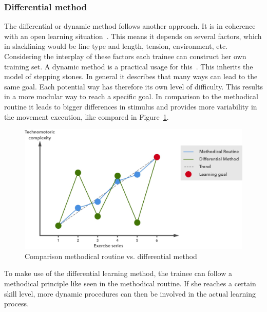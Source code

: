 \subsubsection{Differential method}
The differential or dynamic method follows another approach. It is in coherence with an open learning situation~\cite{Thomann2013-aa}. This means it depends on several factors, which in slacklining would be line type and length, tension, environment, etc. Considering the interplay of these factors each trainee can construct her own training set.
A dynamic method is a practical usage for this~\cite{Beck2008-dl, Schoellhorn1999-ip}. This inherits the model of stepping stones. In general it describes that many ways can lead to the same goal. Each potential way has therefore its own level of difficulty. This results in a more modular way to reach a specific goal. In comparison to the methodical routine it leads to bigger differences in stimulus and provides more variability in the movement execution, like compared in Figure~\ref{fig:3_3_1_comparisonMethods}. 

\begin{figure}[htb]
	\centering
	\begin{minipage}[t]{1\linewidth}
		\centering
		\includegraphics[width=1\linewidth]{Pictures/3_3_1_comparisonMethod2}
		\caption{Comparison methodical routine vs. differential method~\cite{Thomann2013-aa}}
		\label{fig:3_3_1_comparisonMethods}
	\end{minipage}
\end{figure}
To make use of the differential learning method, the trainee can follow a methodical principle like seen in the methodical routine. If she reaches a certain skill level, more dynamic procedures can then be involved in the actual learning process. %

